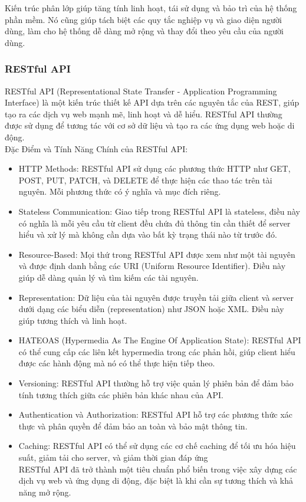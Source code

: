 Kiến trúc phân lớp giúp tăng tính linh hoạt, tái sử dụng và bảo trì của hệ thống phần mềm. Nó cũng giúp tách biệt các quy tắc nghiệp vụ và giao diện người dùng, làm cho hệ thống dễ dàng mở rộng và thay đổi theo yêu cầu của người dùng.
\subsubsection{RESTful API}
RESTful API (Representational State Transfer - Application Programming Interface) là một kiến trúc thiết kế API dựa trên các nguyên tắc của REST, giúp tạo ra các dịch vụ web mạnh mẽ, linh hoạt và dễ hiểu. RESTful API thường được sử dụng để tương tác với cơ sở dữ liệu và tạo ra các ứng dụng web hoặc di động.\\
Đặc Điểm và Tính Năng Chính của RESTful API:
\begin{itemize}
\item HTTP Methods: RESTful API sử dụng các phương thức HTTP như GET, POST, PUT, PATCH, và DELETE để thực hiện các thao tác trên tài nguyên. Mỗi phương thức có ý nghĩa và mục đích riêng.
\item Stateless Communication: Giao tiếp trong RESTful API là stateless, điều này có nghĩa là mỗi yêu cầu từ client đều chứa đủ thông tin cần thiết để server hiểu và xử lý mà không cần dựa vào bất kỳ trạng thái nào từ trước đó.
\item Resource-Based: Mọi thứ trong RESTful API được xem như một tài nguyên và được định danh bằng các URI (Uniform Resource Identifier). Điều này giúp dễ dàng quản lý và tìm kiếm các tài nguyên.
\item Representation: Dữ liệu của tài nguyên được truyền tải giữa client và server dưới dạng các biểu diễn (representation) như JSON hoặc XML. Điều này giúp tương thích và linh hoạt.
\item HATEOAS (Hypermedia As The Engine Of Application State): RESTful API có thể cung cấp các liên kết hypermedia trong các phản hồi, giúp client hiểu được các hành động mà nó có thể thực hiện tiếp theo.
\item Versioning: RESTful API thường hỗ trợ việc quản lý phiên bản để đảm bảo tính tương thích giữa các phiên bản khác nhau của API.
\item Authentication và Authorization: RESTful API hỗ trợ các phương thức xác thực và phân quyền để đảm bảo an toàn và bảo mật thông tin.
\item Caching: RESTful API có thể sử dụng các cơ chế caching để tối ưu hóa hiệu suất, giảm tải cho server, và giảm thời gian đáp ứng\\
RESTful API đã trở thành một tiêu chuẩn phổ biến trong việc xây dựng các dịch vụ web và ứng dụng di động, đặc biệt là khi cần sự tương thích và khả năng mở rộng.
\end{itemize}
